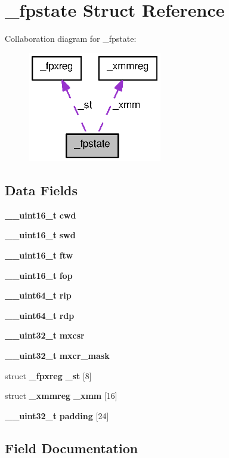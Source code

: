 \section{\_\-fpstate Struct Reference}
\label{struct__fpstate}


Collaboration diagram for \_\-fpstate:
\nopagebreak
\begin{figure}[H]
\begin{center}
\leavevmode
\includegraphics[width=166pt]{struct__fpstate__coll__graph}
\end{center}
\end{figure}
\subsection*{Data Fields}
\begin{DoxyCompactItemize}
\item 
{\bf \_\-\_\-uint16\_\-t} {\bf cwd}
\item 
{\bf \_\-\_\-uint16\_\-t} {\bf swd}
\item 
{\bf \_\-\_\-uint16\_\-t} {\bf ftw}
\item 
{\bf \_\-\_\-uint16\_\-t} {\bf fop}
\item 
{\bf \_\-\_\-uint64\_\-t} {\bf rip}
\item 
{\bf \_\-\_\-uint64\_\-t} {\bf rdp}
\item 
{\bf \_\-\_\-uint32\_\-t} {\bf mxcsr}
\item 
{\bf \_\-\_\-uint32\_\-t} {\bf mxcr\_\-mask}
\item 
struct {\bf \_\-fpxreg} {\bf \_\-st} [8]
\item 
struct {\bf \_\-xmmreg} {\bf \_\-xmm} [16]
\item 
{\bf \_\-\_\-uint32\_\-t} {\bf padding} [24]
\end{DoxyCompactItemize}


\subsection{Field Documentation}
